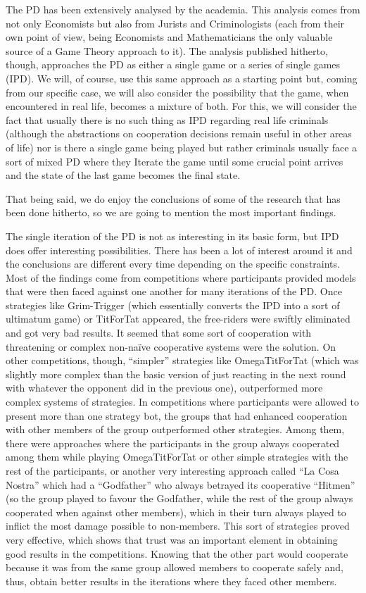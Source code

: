 \documentclass[11pt, a4paper]{article}
\begin{document}
The PD has been extensively analysed by the academia. This analysis comes from not only Economists but also from Jurists and Criminologists (each from their own point of view, being Economists and Mathematicians the only valuable source of a Game Theory approach to it). The analysis published hitherto, though, approaches the PD as either a single game or a series of single games (IPD). We will, of course, use this same approach as a starting point but, coming from our specific case, we will also consider the possibility that the game, when encountered in real life, becomes a mixture of both. For this, we will consider the fact that usually there is no such thing as IPD regarding real life criminals (although the abstractions on cooperation decisions remain useful in other areas of life) nor is there a single game being played but rather criminals usually face a sort of mixed PD where they Iterate the game until some crucial point arrives and the state of the last game becomes the final state.   

That being said, we do enjoy the conclusions of some of the research that has been done hitherto, so we are going to mention the most important findings.

The single iteration of the PD is not as interesting in its basic form, but IPD does offer interesting possibilities. There has been a lot of interest around it and the conclusions are different every time depending on the specific constraints. Most of the findings come from competitions where participants provided models that were then faced against one another for many iterations of the PD. Once strategies like Grim-Trigger (which essentially converts the IPD into a sort of ultimatum game) or TitForTat appeared, the free-riders were swiftly eliminated and got very bad results. It seemed that some sort of cooperation with threatening or complex non-naïve cooperative systems were the solution. On other competitions, though, “simpler” strategies like OmegaTitForTat (which was slightly more complex than the basic version of just reacting in the next round with whatever the opponent did in the previous one), outperformed more complex systems of strategies. In competitions where participants were allowed to present more than one strategy bot, the groups that had enhanced cooperation with other members of the group outperformed other strategies. Among them, there were approaches where the participants in the group always cooperated among them while playing OmegaTitForTat or other simple strategies with the rest of the participants, or another very interesting approach called “La Cosa Nostra” which had a “Godfather” who always betrayed its cooperative “Hitmen” (so the group played to favour the Godfather, while the rest of the group always cooperated when against other members), which in their turn always played to inflict the most damage possible to non-members. This sort of strategies proved very effective, which shows that trust was an important element in obtaining good results in the competitions. Knowing that the other part would cooperate because it was from the same group allowed members to cooperate safely and, thus, obtain better results in the iterations where they faced other members. 
\end{document}
